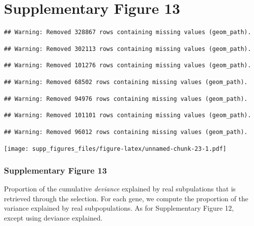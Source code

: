 \documentclass[]{article}
\begin{document}
\newpage

\hypertarget{supplementary-figure-13}{%
\section{Supplementary Figure 13}\label{supplementary-figure-13}}

\begin{verbatim}
## Warning: Removed 328867 rows containing missing values (geom_path).
\end{verbatim}

\begin{verbatim}
## Warning: Removed 302113 rows containing missing values (geom_path).
\end{verbatim}

\begin{verbatim}
## Warning: Removed 101276 rows containing missing values (geom_path).
\end{verbatim}

\begin{verbatim}
## Warning: Removed 68502 rows containing missing values (geom_path).
\end{verbatim}

\begin{verbatim}
## Warning: Removed 94976 rows containing missing values (geom_path).
\end{verbatim}

\begin{verbatim}
## Warning: Removed 101101 rows containing missing values (geom_path).
\end{verbatim}

\begin{verbatim}
## Warning: Removed 96012 rows containing missing values (geom_path).
\end{verbatim}

\texttt{[image: supp\_figures\_files/figure-latex/unnamed-chunk-23-1.pdf]}

\hypertarget{supplementary-figure-13-1}{%
\subsubsection{Supplementary Figure
13}\label{supplementary-figure-13-1}}

Proportion of the cumulative \emph{deviance} explained by real
subpulations that is retrieved through the selection. For each gene, we
compute the proportion of the variance explained by real subpopulations.
As for Supplementary Figure 12, except using deviance explained.
\end{document}
